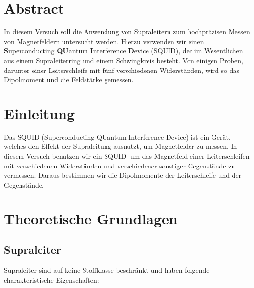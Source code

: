 \documentclass[12pt]{article}
\title{\vspace{0cm}{\Huge Fortgeschrittenen-Praktikum I:\\ \vspace{1cm} SQUID}}
\author{Saskia Bondza\\Simon Stephan}
\date{durchgeführt am 23.09.2016}
\begin{document}
\maketitle
\newpage

\section*{Abstract}

In diesem Versuch soll die Anwendung von Supraleitern zum hochpräzisen  Messen von Magnetfeldern untersucht werden. Hierzu verwenden wir einen \textbf{S}uperconducting \textbf{QU}antum \textbf{I}nterference \textbf{D}evice (SQUID), der im Wesentlichen aus einem Supraleiterring und einem Schwingkreis besteht. Von einigen Proben, darunter einer Leiterschleife mit fünf verschiedenen Widerständen, wird so das Dipolmoment und die Feldstärke gemessen.

\newpage

\thispagestyle{empty}
\tableofcontents
\newpage

\section{Einleitung}

Das SQUID (Superconducting QUantum Interference Device) ist ein Gerät, welches den Effekt der Supraleitung ausnutzt, um Magnetfelder zu messen. In diesem Versuch benutzen wir ein SQUID, um das Magnetfeld einer Leiterschleifen mit verschiedenen Widerständen und verschiedener sonstiger Gegenstände zu vermessen. Daraus bestimmen wir die Dipolmomente der Leiterschleife und der Gegenstände.


\newpage
\section{Theoretische Grundlagen}

\subsection{Supraleiter}\label{supraleiter}
Supraleiter sind auf keine Stoffklasse beschränkt und haben folgende charakteristische Eigenschaften:
\end{document}

